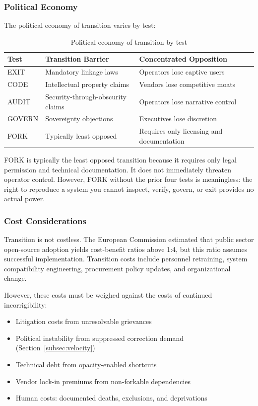 \documentclass{article}
\begin{document}
\subsubsection{Political Economy}

The political economy of transition varies by test:

\begin{table}[h]
\centering
\caption{Political economy of transition by test}
\label{tab:political-economy}
\begin{tabular}{lll}
\hline
\textbf{Test} & \textbf{Transition Barrier} & \textbf{Concentrated Opposition} \\
\hline
EXIT & Mandatory linkage laws & Operators lose captive users \\
CODE & Intellectual property claims & Vendors lose competitive moats \\
AUDIT & Security-through-obscurity claims & Operators lose narrative control \\
GOVERN & Sovereignty objections & Executives lose discretion \\
FORK & Typically least opposed & Requires only licensing and documentation \\
\hline
\end{tabular}
\end{table}

FORK is typically the least opposed transition because it requires only legal permission and technical documentation. It does not immediately threaten operator control. However, FORK without the prior four tests is meaningless: the right to reproduce a system you cannot inspect, verify, govern, or exit provides no actual power.

\subsubsection{Cost Considerations}

Transition is not costless. The European Commission \citep{eu2021oss} estimated that public sector open-source adoption yields cost-benefit ratios above 1:4, but this ratio assumes successful implementation. Transition costs include personnel retraining, system compatibility engineering, procurement policy updates, and organizational change.

However, these costs must be weighed against the costs of continued incorrigibility:

\begin{itemize}
    \item Litigation costs from unresolvable grievances
    \item Political instability from suppressed correction demand (Section~\ref{subsec:velocity})
    \item Technical debt from opacity-enabled shortcuts
    \item Vendor lock-in premiums from non-forkable dependencies
    \item Human costs: documented deaths, exclusions, and deprivations
\end{itemize}
\end{document}
